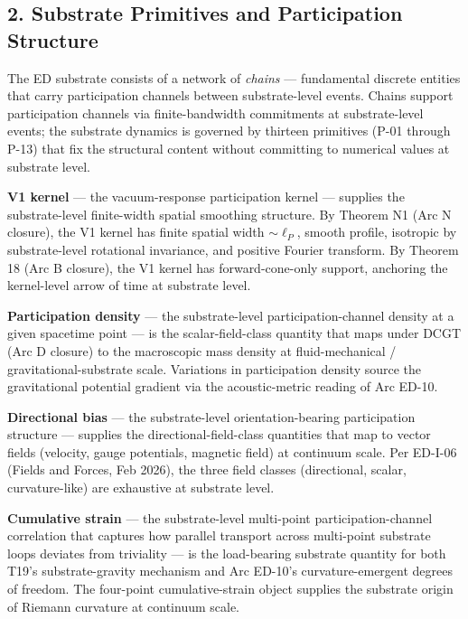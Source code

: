 \documentclass[
]{article}
\begin{document}
\subsection{2. Substrate Primitives and Participation
Structure}\label{substrate-primitives-and-participation-structure}

The ED substrate consists of a network of \emph{chains} --- fundamental
discrete entities that carry participation channels between
substrate-level events. Chains support participation channels via
finite-bandwidth commitments at substrate-level events; the substrate
dynamics is governed by thirteen primitives (P-01 through P-13) that fix
the structural content without committing to numerical values at
substrate level.

\textbf{V1 kernel} --- the vacuum-response participation kernel ---
supplies the substrate-level finite-width spatial smoothing structure.
By Theorem N1 (Arc N closure), the V1 kernel has finite spatial width
\(\sim\ell_P\), smooth profile, isotropic by substrate-level rotational
invariance, and positive Fourier transform. By Theorem 18 (Arc B
closure), the V1 kernel has forward-cone-only support, anchoring the
kernel-level arrow of time at substrate level.

\textbf{Participation density} --- the substrate-level
participation-channel density at a given spacetime point --- is the
scalar-field-class quantity that maps under DCGT (Arc D closure) to the
macroscopic mass density at fluid-mechanical / gravitational-substrate
scale. Variations in participation density source the gravitational
potential gradient via the acoustic-metric reading of Arc ED-10.

\textbf{Directional bias} --- the substrate-level orientation-bearing
participation structure --- supplies the directional-field-class
quantities that map to vector fields (velocity, gauge potentials,
magnetic field) at continuum scale. Per ED-I-06 (Fields and Forces, Feb
2026), the three field classes (directional, scalar, curvature-like) are
exhaustive at substrate level.

\textbf{Cumulative strain} --- the substrate-level multi-point
participation-channel correlation that captures how parallel transport
across multi-point substrate loops deviates from triviality --- is the
load-bearing substrate quantity for both T19's substrate-gravity
mechanism and Arc ED-10's curvature-emergent degrees of freedom. The
four-point cumulative-strain object supplies the substrate origin of
Riemann curvature at continuum scale.
\end{document}
